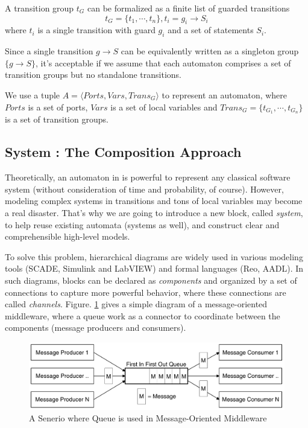 \begin{formalization}
    A transition group $t_G$ can be formalized as a finite list of guarded transitions
    \[
        t_G=\{t_1,\cdots, t_n\}, t_i=g_i\rightarrow S_i
    \]
    where $t_i$ is a single transition with guard $g_i$ and a set of statements $S_i$.
\end{formalization}

Since a single transition $g\rightarrow S$ can be equivalently written as a singleton group $\{g\rightarrow S\}$, it's acceptable if we assume that each automaton comprises a set of transition groups but no standalone transitions.

\begin{formalization}[Automata]
    We use a tuple $A=\langle Ports, Vars, Trans_G \rangle$ to represent an automaton, where $Ports$ is a set of ports, $Vars$ is a set of local variables and $Trans_G=\{t_{G_1},\cdots,t_{G_n}\}$ is a set of transition groups.
\end{formalization}

\subsection{System : The Composition Approach}
\label{subsec:system}

Theoretically, an automaton in \lang{} is powerful to represent any classical software system (without consideration of time and probability, of course). However, modeling complex systems in transitions and tons of local variables may become a real disaster. That's why we are going to introduce a new block, called \emph{system}, to help reuse existing automata (systems as well), and construct clear and comprehensible high-level models.

To solve this problem, hierarchical diagrams are widely used in various modeling tools (SCADE\cite{AbdullaISoLA2006,BerryScp1992}, Simulink and LabVIEW) and formal languages (Reo\cite{ArbabMscs2004}, AADL). In such diagrams, blocks can be declared as \emph{components} and organized by a set of connections to capture more powerful behavior, where these connections are called \emph{channels}. Figure. \ref{fig:diagram} gives a simple diagram of a message-oriented middleware, where a queue work as a connector to coordinate between the components (message producers and consumers).

\begin{figure}
    \centering
    \includegraphics[width=.8\textwidth]{images/middleware_queue.png}
    \caption{A Senerio where Queue is used in Message-Oriented Middleware\cite{CurryMfc2004}}
    \label{fig:diagram}
\end{figure}


